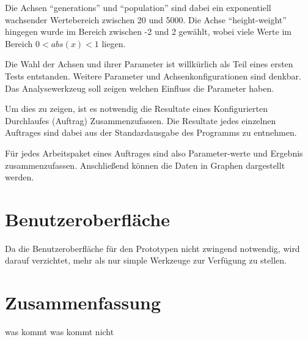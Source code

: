Die Achsen ``generations'' und ``population'' sind dabei ein exponentiell wachsender Wertebereich zwischen 20 und 5000.
Die Achse ``height-weight'' hingegen wurde im Bereich zwischen -2 und 2 gewählt,
wobei viele Werte im Bereich $ 0<abs(x)<1$ liegen.

Die Wahl der Achsen und ihrer Parameter ist willkürlich als Teil eines ersten Tests entstanden.
Weitere Parameter und Achsenkonfigurationen sind denkbar.
Das Analysewerkzeug soll zeigen welchen Einfluss die Parameter haben.

Um dies zu zeigen, ist es notwendig die Resultate
eines Konfigurierten Durchlaufes (Auftrag) Zusammenzufassen.
Die Resultate jedes einzelnen Auftrages sind dabei aus der Standardausgabe
des Programms zu entnehmen.

Für jedes Arbeitspaket eines Auftrages sind also Parameter-werte und Ergebnis zusammenzufassen.
Anschließend können die Daten in Graphen dargestellt werden.


\section{Benutzeroberfläche}

Da die Benutzeroberfläche für den Prototypen nicht zwingend notwendig,
wird darauf verzichtet, mehr als nur simple Werkzeuge zur Verfügung zu stellen.


\section{Zusammenfassung}

was kommt
was kommt nicht
